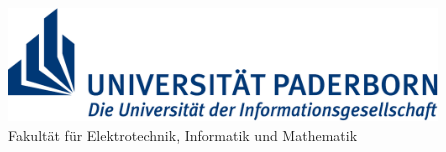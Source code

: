 \thispagestyle{empty}
\begin{titlepage}
\begin{center}
	
	\begin{minipage}{13.5cm}		
		\includegraphics[height=3cm]{Images/TitlePage/uni-logo}\\
		\textsf{
    \hspace*{2.0cm} Fakult\"at f\"ur Elektrotechnik, Informatik und Mathematik \\
		}
	\end{minipage}\\[60pt]
  
  
  \begin{doublespace}
		{\Huge\textbf{\meinTitel}}\\[30pt]
	\end{doublespace} 
  

\end{center}
\end{titlepage}
